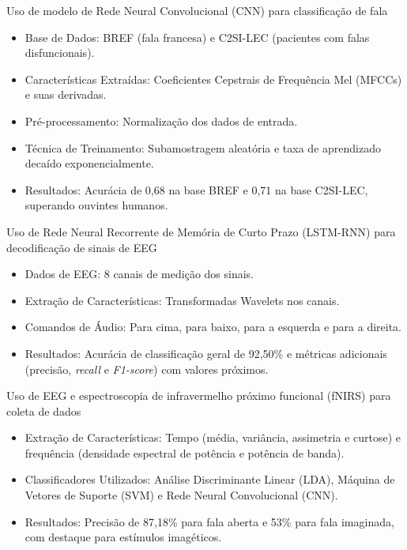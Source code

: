 \documentclass[aspectratio=169]{beamer}
\begin{document}
	\begin{frame}{Uso de modelo de Rede Neural Convolucional (CNN) para classificação de fala \cite{abderrazek20_interspeech}}
		\begin{itemize}
			\item Base de Dados: BREF (fala francesa) e C2SI-LEC (pacientes com falas disfuncionais).
			\item Características Extraídas: Coeficientes Cepstrais de Frequência Mel (MFCCs) e suas derivadas.
			\item Pré-processamento: Normalização dos dados de entrada.
			\item Técnica de Treinamento: Subamostragem aleatória e taxa de aprendizado decaído exponencialmente.
			\item Resultados: Acurácia de 0,68 na base BREF e 0,71 na base C2SI-LEC, superando ouvintes humanos.
		\end{itemize}
		
	\end{frame}

	\begin{frame}{Uso de Rede Neural Recorrente de Memória de Curto Prazo (LSTM-RNN) para decodificação de sinais de EEG \cite{pawar2022wavelet}}
		\begin{itemize}
			\item Dados de EEG: 8 canais de medição dos sinais.
			\item Extração de Características: Transformadas Wavelets nos canais.
			\item Comandos de Áudio: Para cima, para baixo, para a esquerda e para a direita.
			\item Resultados: Acurácia de classificação geral de 92,50\% e métricas adicionais (precisão, \textit{recall} e \textit{F1-score}) com valores próximos.
		\end{itemize}
		
	\end{frame}
	
	\begin{frame}{Uso de EEG e espectroscopia de infravermelho próximo funcional (fNIRS) para coleta de dados \cite{cooney2021bimodal}}
		\begin{itemize}
			\item Extração de Características: Tempo (média, variância, assimetria e curtose) e frequência (densidade espectral de potência e potência de banda).
			\item Classificadores Utilizados: Análise Discriminante Linear (LDA), Máquina de Vetores de Suporte (SVM) e Rede Neural Convolucional (CNN).
			\item Resultados: Precisão de 87,18\% para fala aberta e 53\% para fala imaginada, com destaque para estímulos imagéticos.
		\end{itemize}
		
	\end{frame}
	
\end{document}
